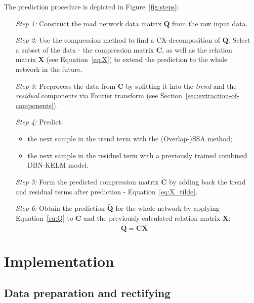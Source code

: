 \begin{samepage}
	The prediction procedure is depicted in Figure~\ref{fig:steps}:
	\begin{itemize}
		\item[\textit{Step 1:}] Construct the road network data matrix
		$\mathbf{Q}$
		from the raw input data.
		\item[\textit{Step 2:}] Use the compression method to find a
		CX-decomposition of $\mathbf{Q}$. Select a subset of the data - the
		compression matrix $\mathbf{C}$, as well as the relation matrix
		$\mathbf{X}$
		(see Equation~\ref{eq:X})
		to extend the prediction to the whole network in the future.
		\item[\textit{Step 3:}] Preprocess the data from $\mathbf{C}$ by
		splitting
		it into the \textit{trend} and the \textit{residual} components via
		Fourier
		transform (see Section~\ref{sec:extraction-of-components}).
		\item[\textit{Step 4:}] Predict:
		\begin{itemize}
			\item the next sample in the trend term with the (Overlap-)SSA
			method;
			\item the next sample in the residuel term with a previously trained
			combined DBN-KELM model.
		\end{itemize}
		\item[\textit{Step 5:}] Form the predicted compression matrix
		$\tilde{\mathbf{C}}$ by adding back the trend and residual terms after
		prediction - Equation~\ref{eq:X_tilde}.
		\item[\textit{Step 6:}] Obtain the prediction $\tilde{\mathbf{Q}}$ for
		the whole network by applying Equation~\ref{eq:Q} to
		$\tilde{\mathbf{C}}$ and the previously calculated relation matrix
		$\mathbf{X}$:
		\begin{equation}
			\tilde{\mathbf{Q}}=\tilde{\mathbf{C}}\mathbf{X}
			\label{eq:Q_tilde}
		\end{equation}
	\end{itemize}
\end{samepage}


\chapter{Implementation}

\section{Data preparation and rectifying} \label{sec:data-preparation}


